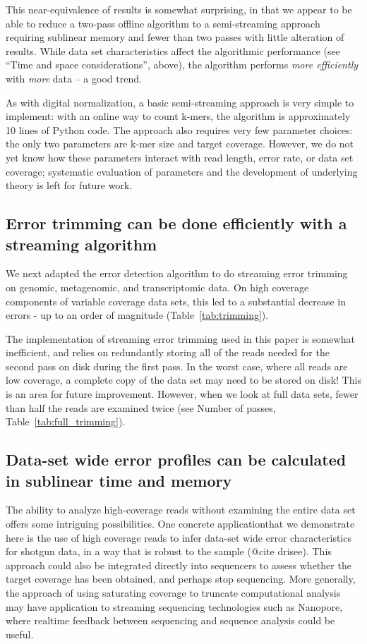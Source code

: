 \documentclass{article}
\begin{document}
This near-equivalence of results is somewhat surprising, in that we
appear to be able to reduce a two-pass offline algorithm to a
semi-streaming approach requiring sublinear memory and fewer than two
passes with little alteration of results.  While data set
characteristics affect the algorithmic performance (see ``Time and
space considerations'', above), the algorithm performs {\em more
  efficiently} with {\em more} data -- a good trend.

As with digital normalization, a basic semi-streaming approach is very
simple to implement: with an online way to count k-mers, the algorithm
is approximately 10 lines of Python code.  The approach also requires
very few parameter choices: the only two parameters are k-mer size and
target coverage.  However, we do not yet know how these parameters
interact with read length, error rate, or data set coverage;
systematic evaluation of parameters and the development of underlying
theory is left for future work.

\subsection{Error trimming can be done efficiently with a streaming algorithm}

We next adapted the error detection algorithm to do streaming error
trimming on genomic, metagenomic, and transcriptomic data.  On high
coverage components of variable coverage data sets, this led to a
substantial decrease in errors - up to an order of magnitude
(Table~\ref{tab:trimming}).

The implementation of streaming error trimming used in this paper is
somewhat inefficient, and relies on redundantly storing all of the
reads needed for the second pass on disk during the first pass.  In
the worst case, where all reads are low coverage, a complete copy of
the data set may need to be stored on disk!  This is an area for
future improvement.  However, when we look at full data sets, fewer
than half the reads are examined twice (see Number of passes,
Table~\ref{tab:full_trimming}).

\subsection{Data-set wide error profiles can be calculated in sublinear time and memory}

The ability to analyze high-coverage reads without examining the
entire data set offers some intriguing possibilities.  One concrete
applicationthat we demonstrate here is the use of high coverage reads
to infer data-set wide error characteristics for shotgun data, in a
way that is robust to the sample (@cite drisee).  This approach could
also be integrated directly into sequencers to assess whether the
target coverage has been obtained, and perhaps stop sequencing.  More
generally, the approach of using saturating coverage to truncate
computational analysis may have application to streaming sequencing
technologies such as Nanopore, where realtime feedback between
sequencing and sequence analysis could be useful.
\end{document}

